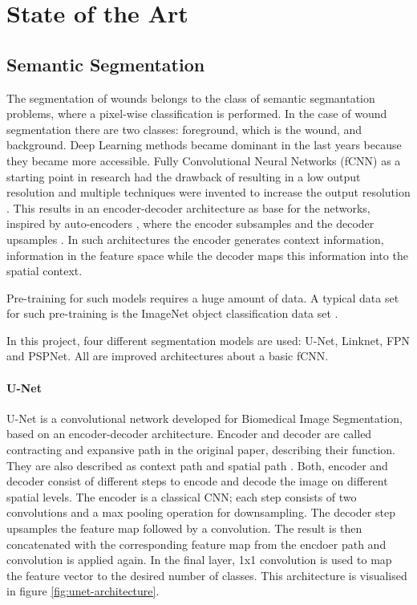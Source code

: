 \section{State of the Art}

\subsection{Semantic Segmentation}

The segmentation of wounds belongs to the class of semantic segmantation problems, where a pixel-wise classification is performed. In the case of wound segmentation there are two classes: foreground, which is the wound, and background. Deep Learning methods became dominant in the last years because they became more accessible. Fully Convolutional Neural Networks (fCNN) as a starting point in research had the drawback of resulting in a low output resolution and multiple techniques were invented to increase the output resolution \cite{Litjens2017}. This results in an encoder-decoder architecture as base for the networks, inspired by auto-encoders \cite{linknet}, where the encoder subsamples and the decoder upsamples \cite{Norelyaqine2023}. In such architectures the encoder generates context information, information in the feature space while the decoder maps this information into the spatial context.

Pre-training for such models requires a huge amount of data. A typical data set for such pre-training is the ImageNet object classification data set \cite{SegNet}.

In this project, four different segmentation models are used: U-Net, Linknet, FPN and PSPNet. All are improved architectures about a basic fCNN.

\paragraph{U-Net}

U-Net is a convolutional network developed for Biomedical Image Segmentation, based on an encoder-decoder architecture. Encoder and decoder are called contracting and expansive path in the original paper, describing their function. They are also described as context path and spatial path \cite{MO2022626}. Both, encoder and decoder consist of different steps to encode and decode the image on different spatial levels. The encoder is a classical CNN; each step consists of two convolutions and a max pooling operation for downsampling. The decoder step upsamples the feature map followed by a convolution. The result is then concatenated with the corresponding feature map from the encdoer path and convolution is applied again. In the final layer, 1x1 convolution is used to map the feature vector to the desired number of classes. This architecture is visualised in figure \ref{fig:unet-architecture}. \cite{unet}

